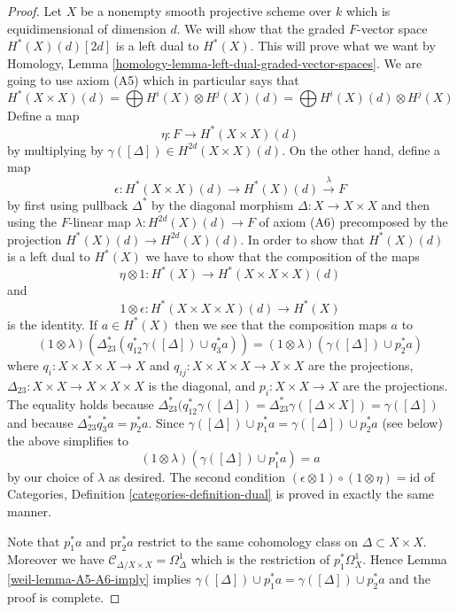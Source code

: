 \begin{proof}

Let $X$ be a nonempty smooth projective scheme over $k$ which is
equidimensional of dimension $d$. We will show that the graded $F$-vector space
$H^*(X)(d)[2d]$ is a left dual to $H^*(X)$. This will prove what we want by
Homology, Lemma \ref{homology-lemma-left-dual-graded-vector-spaces}. We are
going to use axiom (A5) which in particular says that
$$
H^*(X \times X)(d) =
\bigoplus H^i(X) \otimes H^j(X)(d) =
\bigoplus H^i(X)(d) \otimes H^j(X)
$$
Define a map
$$
\eta : F \longrightarrow H^*(X \times X)(d)
$$
by multiplying by $\gamma([\Delta]) \in H^{2d}(X \times X)(d)$.
On the other hand, define a map
$$
\epsilon :
H^*(X \times X)(d) \longrightarrow H^*(X)(d) \xrightarrow{\lambda} F
$$
by first using pullback $\Delta^*$ by the diagonal morphism
$\Delta : X \to X \times X$ and then using the $F$-linear map
$\lambda : H^{2d}(X)(d) \to F$ of axiom (A6) precomposed
by the projection $H^*(X)(d) \to H^{2d}(X)(d)$.
In order to show that $H^*(X)(d)$ is a left dual to $H^*(X)$
we have to show that the composition of the maps
$$
\eta \otimes 1 :
H^*(X) \longrightarrow H^*(X \times X \times X)(d)
$$
and
$$
1 \otimes \epsilon : H^*(X \times X \times X)(d) \longrightarrow H^*(X)
$$
is the identity. If $a \in H^*(X)$ then we see
that the composition maps $a$ to
$$
(1 \otimes \lambda)(\Delta_{23}^*(q_{12}^*\gamma([\Delta]) \cup q_3^*a)) =
(1 \otimes \lambda)(\gamma([\Delta]) \cup p_2^*a)
$$
where $q_i : X \times X \times X \to X$ and
$q_{ij} : X \times X \times X \to X \times X$ are the projections,
$\Delta_{23} : X \times X \to X \times X \times X$ is the diagonal, and
$p_i : X \times X \to X$ are the projections.
The equality holds because $\Delta_{23}^*(q_{12}^*\gamma([\Delta]) =
\Delta_{23}^*\gamma([\Delta \times X]) = \gamma([\Delta])$
and because $\Delta_{23}^* q_3^*a = p_2^*a$.
Since $\gamma([\Delta]) \cup p_1^*a = \gamma([\Delta]) \cup p_2^*a$
(see below) the above simplifies to
$$
(1 \otimes \lambda)(\gamma([\Delta]) \cup p_1^*a) = a
$$
by our choice of $\lambda$ as desired. The second condition
$(\epsilon \otimes 1) \circ (1 \otimes \eta) = \text{id}$
of Categories, Definition \ref{categories-definition-dual}
is proved in exactly the
same manner.

\medskip\noindent
Note that $p_1^*a$ and $\text{pr}_2^*a$ restrict to the same
cohomology class on $\Delta \subset X \times X$. Moreover we
have $\mathcal{C}_{\Delta/X \times X} = \Omega^1_\Delta$ which
is the restriction of $p_1^*\Omega^1_X$. Hence
Lemma \ref{weil-lemma-A5-A6-imply} implies
$\gamma([\Delta]) \cup p_1^*a = \gamma([\Delta]) \cup p_2^*a$
and the proof is complete.
\end{proof}


